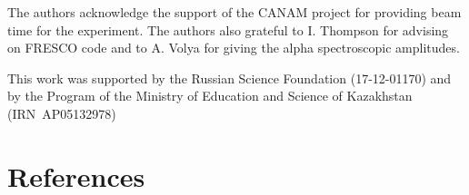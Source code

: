 \documentclass[10pt]{iopart}
\begin{document}
\ack
	The authors acknowledge the support of the CANAM project \cite{canam} for providing beam time for the experiment. The authors also grateful to I. Thompson for advising on FRESCO code and to A. Volya for giving the alpha spectroscopic amplitudes.
	
	This work was supported by the Russian Science Foundation (17-12-01170) and by the Program of the Ministry of Education and Science of Kazakhstan (IRN~AP05132978)



\section*{References}



\end{document}
